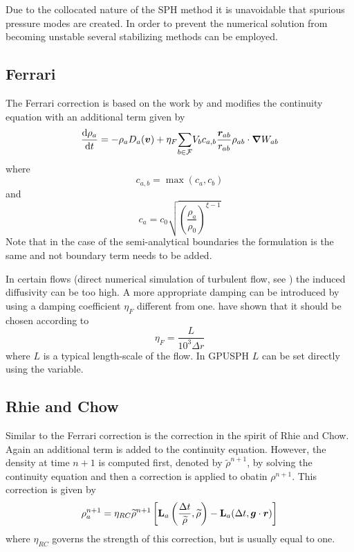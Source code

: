 \documentclass{../GPUSPHtemplate}
\begin{document}
Due to the collocated nature of the SPH method it is unavoidable that
spurious pressure modes are created. In order to prevent the numerical
solution from becoming unstable several stabilizing methods can be
employed.

\subsection{Ferrari}

The Ferrari correction is based on the work by \cite{Ferrari2009}
and modifies the continuity equation with an additional term given by
\begin{equation}
\frac{\text{d} \rho_a}{\text{d} t} = -\rho_a D_a(\bm{v}) + \eta_F \underset{b \in \mathcal{F}}{\sum} V_b c_{a,b}\frac{\bm{r}_{ab}}{r_{ab}}\rho_{ab}\cdot\bm{\nabla} W_{ab}
\label{e:ferrari:cont}
\end{equation}
where
\begin{equation}
c_{a,b} = \max(c_a,c_b)
\label{e:ferrari:upw}
\end{equation}
and
\begin{equation}
c_a = c_0\sqrt{\left(\frac{\rho_a}{\rho_0}\right)^{\xi-1}}
\label{e:ferrari:ca}
\end{equation}
Note that in the case of the semi-analytical boundaries the formulation
is the same and not boundary term needs to be added.

In certain flows (\eg direct numerical simulation of turbulent flow,
see \cite{Mayrhofer-spheric-2013}) the induced diffusivity can be too high.
A more appropriate damping can be introduced by using a damping
coefficient $\eta_F$ different from one.
\cite{mayrhofer_investigation_2013} have shown that it should be chosen
according to
\begin{equation}
\eta_F = \frac{L}{10^3 \Delta r}
\label{e:ferrari:eta}
\end{equation}
where $L$ is a typical length-scale of the flow. In GPUSPH $L$ can be
set directly using the  variable.

\subsection{Rhie and Chow}

Similar to the Ferrari correction is the correction in the spirit of
Rhie and Chow.
Again an additional term is added to the
continuity equation. However, the density at time $n+1$ is computed
first, denoted by $\widetilde{\rho}^{n+1}$, by solving the continuity
equation and then a correction is applied to obatin $\rho^{n+1}$. This
correction is given by
\begin{equation}
\rho_a^{n+1} = \eta_{RC} \widetilde{\rho}^{n+1} \left[ \textbf{L}_a\left(
\frac{\Delta t}{\widetilde{\rho}}, \widetilde{\rho}
\right) - \textbf{L}_a (\Delta t, \bm{g}\cdot\bm{r})\right]
\label{e:rc}
\end{equation}
where $\eta_{RC}$ governs the strength of this correction, but is
usually equal to one.
\end{document}
